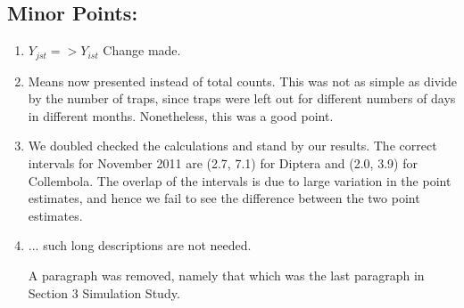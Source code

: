 \documentclass[12pt]{article}
\begin{document}
\subsection{Minor Points:}

\begin{enumerate}
\item  $Y_{jst} => Y_{ist}$ Change made.

\item  Means now presented instead of total counts.  This was not as simple as divide by the number of traps, since traps were left out for different numbers of days in different months.  Nonetheless, this was a good point.

\item  We doubled checked the calculations and stand by our results.  The correct intervals for November 2011 are (2.7, 7.1) for Diptera and (2.0, 3.9) for Collembola.  The overlap of the intervals is due to large variation in the point estimates, and hence we fail to see the difference between the two point estimates.

\item  ... such long descriptions are not needed.

A paragraph was removed, namely that which was the last paragraph in Section 3 Simulation Study.
\end{enumerate}
\end{document}
